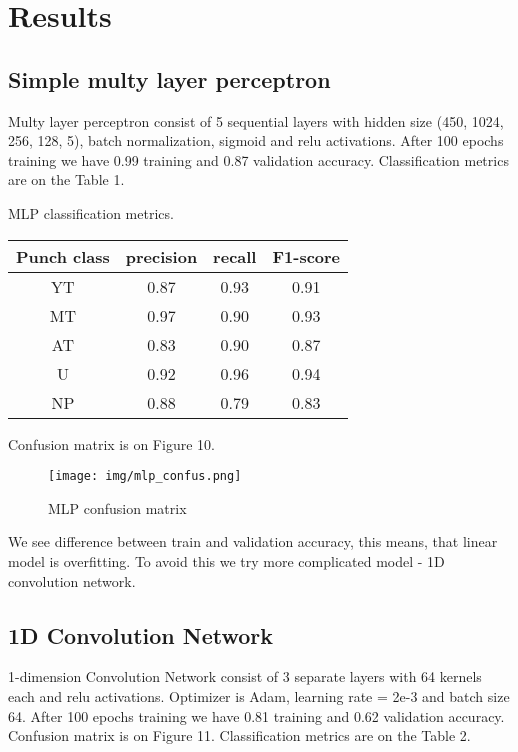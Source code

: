\documentclass[sport,article,submit,moreauthors,pdftex]{Definitions/mdpi}
\begin{document}
\section{Results}

\subsection{Simple multy layer perceptron}
Multy layer perceptron consist of 5 sequential layers with hidden size (450, 1024, 256, 128, 5), batch normalization, sigmoid and relu activations. After 100 epochs training we have 0.99 training and 0.87 validation accuracy. Classification metrics are on the Table 1.

\begin{specialtable}[H]
\caption{MLP classification metrics.}
\label{tab1}
\begin{tabular}{cccc}
\toprule
\textbf{Punch class}	& \textbf{precision}	& \textbf{recall}	& \textbf{F1-score}\\
\midrule
YT		& 0.87		& 0.93		& 0.91\\
MT		& 0.97		& 0.90		& 0.93\\
AT		& 0.83		& 0.90		& 0.87\\
U		& 0.92		& 0.96		& 0.94\\
NP		& 0.88		& 0.79		& 0.83\\
\bottomrule
\end{tabular}
\end{specialtable}

Confusion matrix is on Figure 10.

\begin{figure}[H]
\texttt{[image: img/mlp\_confus.png]}
\caption{MLP confusion matrix}
\end{figure}

We see difference between train and validation accuracy, this means, that linear model is overfitting.
To avoid this we try more complicated model - 1D convolution network.


\subsection{1D Convolution Network}
1-dimension Convolution Network consist of 3 separate layers with 64 kernels each and relu activations.
Optimizer is Adam, learning rate = 2e-3 and batch size 64.
After 100 epochs training we have 0.81 training and 0.62 validation accuracy. Confusion matrix is on Figure 11. Classification metrics are on the Table 2.
\end{document}
